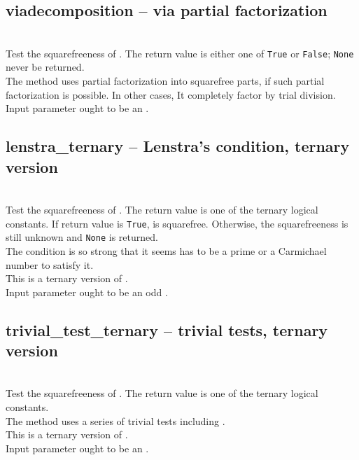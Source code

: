  \subsection{viadecomposition -- via partial factorization}
 \\
 \spacing
 \quad Test the squarefreeness of .
 The return value is either one of {\tt True} or {\tt False};
 {\tt None} never be returned. \\
 \spacing
 The method uses partial factorization into squarefree parts,
 if such partial factorization is possible.  In other cases,
 It completely factor  by trial division.
 \spacing
 \quad Input parameter  ought to be an .
% 
 \subsection{lenstra\_ternary -- Lenstra's condition, ternary version}
 \\
 \spacing
 \quad Test the squarefreeness of . The return value is one of the ternary logical constants.  If return value is {\tt True},  is squarefree.  Otherwise, the squarefreeness is still unknown and {\tt None} is returned. \\
 \spacing
 \negok The condition is so strong that it seems  has to be a
 prime or a Carmichael number to satisfy it.\\
 This is a ternary version of . \\
 \spacing
 \quad Input parameter  ought to be an odd .
 \subsection{trivial\_test\_ternary -- trivial tests, ternary version}
 \\
 \spacing
 \quad Test the squarefreeness of .
 The return value is one of the ternary logical constants. \\
 \spacing
 The method uses a series of trivial tests including . \\
 This is a ternary version of . \\
 \spacing
 \quad Input parameter  ought to be an .
% 

